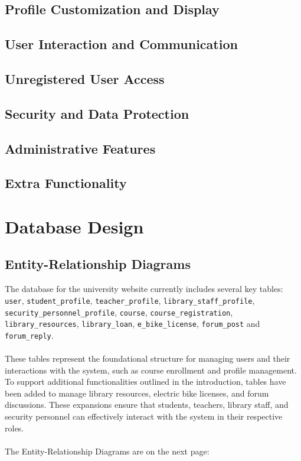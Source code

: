 \documentclass[12pt]{article}
\begin{document}
\subsection{Profile Customization and Display}
\subsection{User Interaction and Communication}
\subsection{Unregistered User Access}
\subsection{Security and Data Protection}
\subsection{Administrative Features}
\subsection{Extra Functionality}

\newpage
\section{Database Design}

\subsection{Entity-Relationship Diagrams}
The database for the university website currently includes several key tables: \texttt{user},
\texttt{student\_profile}, \texttt{teacher\_profile}, \texttt{library\_staff\_profile},
\texttt{security\_personnel\_profile}, \texttt{course}, \texttt{course\_registration}, \texttt{library\_resources},
\texttt{library\_loan}, \texttt{e\_bike\_license}, \texttt{forum\_post} and \texttt{forum\_reply}.\\ \\
These tables represent the foundational structure for managing users and their interactions with the system,
such as course enrollment and profile management. To support additional functionalities outlined in the introduction,
tables have been added to manage library resources, electric bike licenses, and forum discussions.
These expansions ensure that students, teachers, library staff, and security personnel can effectively interact
with the system in their respective roles. \\ \\
The Entity-Relationship Diagrams are on the next page:
\end{document}
